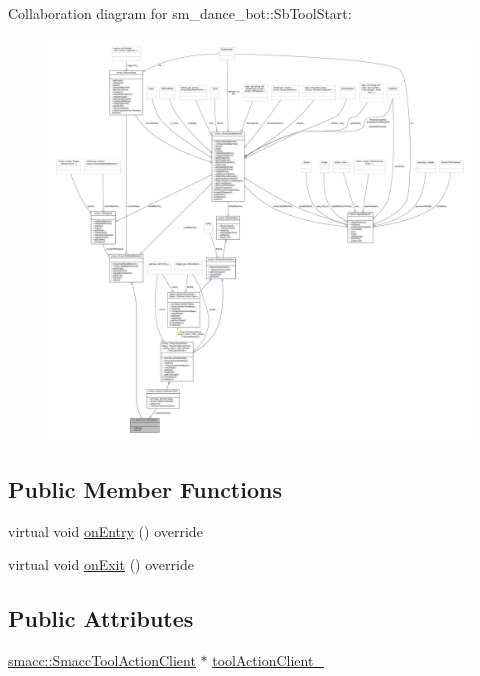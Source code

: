Collaboration diagram for sm\+\_\+dance\+\_\+bot\+:\+:Sb\+Tool\+Start\+:
\nopagebreak
\begin{figure}[H]
\begin{center}
\leavevmode
\includegraphics[width=350pt]{classsm__dance__bot_1_1SbToolStart__coll__graph}
\end{center}
\end{figure}
\subsection*{Public Member Functions}
\begin{DoxyCompactItemize}
\item 
virtual void \hyperlink{classsm__dance__bot_1_1SbToolStart_a59ac81e0b089640c72a35d1606b30d1d}{on\+Entry} () override
\item 
virtual void \hyperlink{classsm__dance__bot_1_1SbToolStart_a9d01fb5bcc2df69f210f05398e415fc2}{on\+Exit} () override
\end{DoxyCompactItemize}
\subsection*{Public Attributes}
\begin{DoxyCompactItemize}
\item 
\hyperlink{classsmacc_1_1SmaccToolActionClient}{smacc\+::\+Smacc\+Tool\+Action\+Client} $\ast$ \hyperlink{classsm__dance__bot_1_1SbToolStart_ad15f128678ba29a7f07e9570ef4df7aa}{tool\+Action\+Client\+\_\+}
\end{DoxyCompactItemize}


